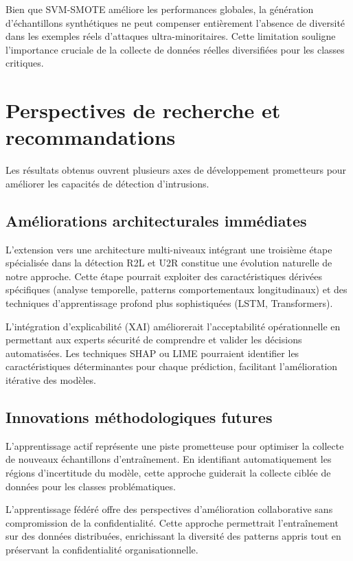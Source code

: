 Bien que SVM-SMOTE améliore les performances globales, la génération d'échantillons synthétiques ne peut compenser entièrement l'absence de diversité dans les exemples réels d'attaques ultra-minoritaires. Cette limitation souligne l'importance cruciale de la collecte de données réelles diversifiées pour les classes critiques.

\section{Perspectives de recherche et recommandations}

Les résultats obtenus ouvrent plusieurs axes de développement prometteurs pour améliorer les capacités de détection d'intrusions.

\subsection{Améliorations architecturales immédiates}

L'extension vers une architecture multi-niveaux intégrant une troisième étape spécialisée dans la détection R2L et U2R constitue une évolution naturelle de notre approche. Cette étape pourrait exploiter des caractéristiques dérivées spécifiques (analyse temporelle, patterns comportementaux longitudinaux) et des techniques d'apprentissage profond plus sophistiquées (LSTM, Transformers).

L'intégration d'explicabilité (XAI) améliorerait l'acceptabilité opérationnelle en permettant aux experts sécurité de comprendre et valider les décisions automatisées. Les techniques SHAP ou LIME pourraient identifier les caractéristiques déterminantes pour chaque prédiction, facilitant l'amélioration itérative des modèles.

\subsection{Innovations méthodologiques futures}

L'apprentissage actif représente une piste prometteuse pour optimiser la collecte de nouveaux échantillons d'entraînement. En identifiant automatiquement les régions d'incertitude du modèle, cette approche guiderait la collecte ciblée de données pour les classes problématiques.

L'apprentissage fédéré offre des perspectives d'amélioration collaborative sans compromission de la confidentialité. Cette approche permettrait l'entraînement sur des données distribuées, enrichissant la diversité des patterns appris tout en préservant la confidentialité organisationnelle.

